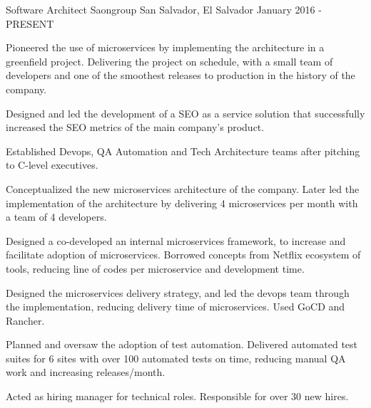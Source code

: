 

\begin{cventries}

  \cventry
    {Software Architect} %
    {Saongroup} %
    {San Salvador, El Salvador} %
    {January 2016 - PRESENT} %
    {
      \begin{cvitems} %
        \item {Pioneered the use of microservices by implementing the architecture in a greenfield project. Delivering the project on schedule, with a small team of developers and one of the smoothest releases to production in the history of the company.}
        \item {Designed and led the development of a SEO as a service solution that successfully increased the SEO metrics of the main company's product.}
        \item {Established Devops, QA Automation and Tech Architecture teams after pitching to C-level executives.}
        \item {Conceptualized the new microservices architecture of the company. Later led the implementation of the architecture by delivering 4 microservices per month with a team of 4 developers.}
        \item {Designed a co-developed an internal microservices framework, to increase and facilitate adoption of microservices. Borrowed concepts from Netflix ecosystem of tools, reducing line of codes per microservice and development time.}
        \item {Designed the microservices delivery strategy, and led the devops team through the implementation, reducing delivery time of microservices. Used GoCD and Rancher.}
        \item {Planned and oversaw the adoption of test automation. Delivered automated test suites for 6 sites with over 100 automated tests on time, reducing manual QA work and increasing releases/month.}
        \item {Acted as hiring manager for technical roles. Responsible for over 30 new hires.}

\end{cvitems}}
\end{cventries}
